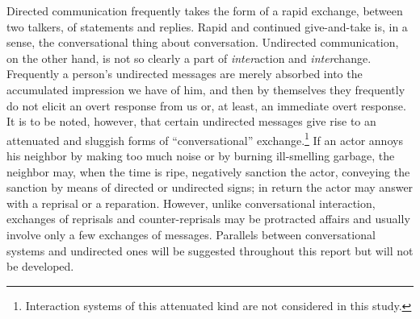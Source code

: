 \documentclass[twoside,symmetric,nobib,justified]{tufte-book}
\begin{document}
Directed communication frequently takes the form of a rapid exchange,
between two talkers, of statements and replies. Rapid and continued
give-and-take is, in a sense, the conversational thing about
conversation. Undirected communication, on the other hand, is not so
clearly a part of \emph{inter}action and \emph{inter}change. Frequently
a person's undirected messages are merely absorbed into the accumulated
impression we have of him, and then by themselves they frequently do not
elicit an overt response from us or, at least, an immediate overt
response. It is to be noted, however, that certain undirected messages
give rise to an attenuated and sluggish forms of ``conversational''
exchange.\footnote{Interaction systems of this attenuated kind are not
  considered in this study.} If an actor annoys his neighbor by making
too much noise or by burning ill-smelling garbage, the neighbor may,
when the time is ripe, negatively sanction the actor, conveying the
sanction by means of directed or undirected signs; in return the actor
may answer with a reprisal or a reparation. However, unlike
conversational interaction, exchanges of reprisals and counter-reprisals
may be protracted affairs and usually involve only a few exchanges of
messages. Parallels between conversational systems and undirected ones
will be suggested throughout this report but will not be developed.
\end{document}
